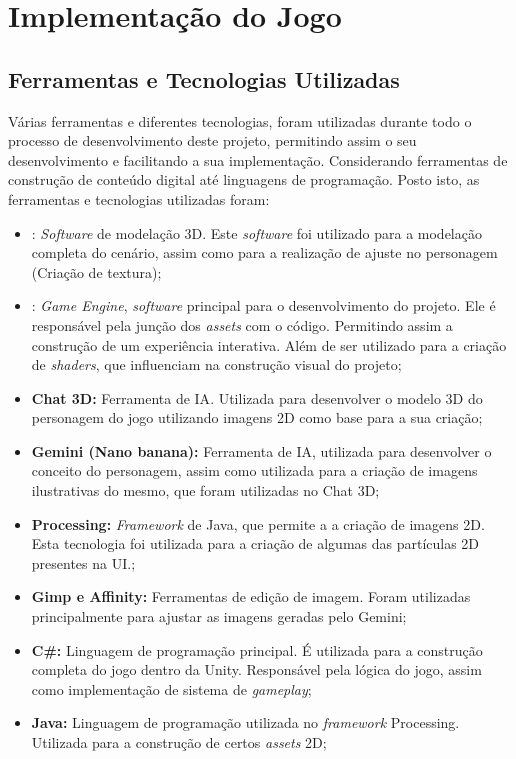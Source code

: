 \chapter{Implementação do Jogo}
\label{cap4}

\section{Ferramentas e Tecnologias Utilizadas}

Várias ferramentas e diferentes tecnologias, foram utilizadas durante todo o processo de
desenvolvimento deste projeto, permitindo assim o seu desenvolvimento e facilitando a sua
implementação. Considerando ferramentas de construção de conteúdo digital até linguagens de programação.
Posto isto, as ferramentas e tecnologias utilizadas foram:

\begin{itemize}
    \item \textbf{\textcite{Blender}}: \textit{Software} de modelação 3D. Este \textit{software} foi utilizado para a modelação completa do cenário, assim como para a realização de ajuste no personagem (Criação de textura);
    \item \textbf{\textcite{Unity}}: \textit{Game Engine}, \textit{software} principal para o desenvolvimento do projeto. Ele é responsável pela junção dos \textit{assets} com o código. Permitindo assim a construção de um experiência interativa. Além de ser utilizado para a criação de \textit{shaders}, que influenciam na construção visual do projeto;
    \item \textbf{Chat 3D:} Ferramenta de \ac{IA}. Utilizada para desenvolver o modelo 3D do personagem do jogo utilizando imagens 2D como base para a sua criação;
    \item \textbf{Gemini (Nano banana):} Ferramenta de \ac{IA}, utilizada para desenvolver o conceito do personagem, assim como utilizada para a criação de imagens ilustrativas do mesmo, que foram utilizadas no Chat 3D;
    \item \textbf{Processing:} \textit{Framework} de Java, que permite a a criação de imagens 2D. Esta tecnologia foi utilizada para a criação de algumas das partículas 2D presentes na \ac{UI}.;
    \item \textbf{Gimp e Affinity:} Ferramentas de edição de imagem. Foram utilizadas principalmente para ajustar as imagens geradas pelo Gemini;
    \item \textbf{C\#:} Linguagem de programação principal. É utilizada para a construção completa do jogo dentro da Unity. Responsável pela lógica do jogo, assim como implementação de sistema de \textit{gameplay};
    \item \textbf{Java:} Linguagem de programação utilizada no \textit{framework} Processing. Utilizada para a construção de certos \textit{assets} 2D;
\end{itemize}

